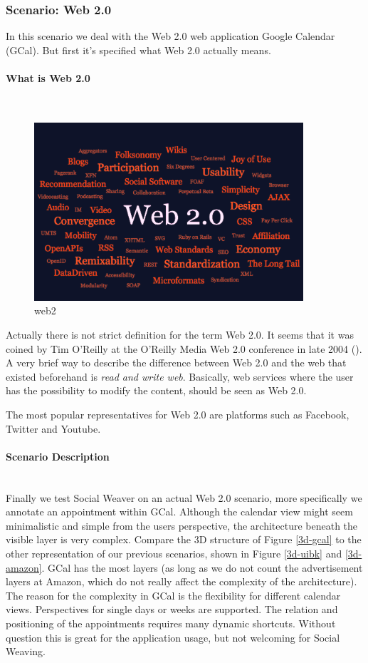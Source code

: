 \subsubsection{Scenario: Web 2.0}
In this scenario we deal with the Web 2.0 web application Google Calendar (GCal). But first it's specified what Web 2.0 actually means.

\paragraph{What is Web 2.0}\mbox{}\\
\begin{figure}\centering
		\includegraphics[width=10cm]{images/web2.png}
		\caption{web2}
		\label{Web 2.0 tag cloud - a common Web 2.0 feature itself.}
\end{figure} 

Actually there is not strict definition for the term Web 2.0. It seems that it was coined by Tim O'Reilly at the O'Reilly Media Web 2.0 conference in late 2004 (\cite{o2005web}). A very brief way to describe the difference between Web 2.0 and the web that existed beforehand is \emph{read and write web}. Basically, web services where the user has the possibility to modify the content, should be seen as Web 2.0. 

The most popular representatives for Web 2.0 are platforms such as Facebook, Twitter and Youtube.

\paragraph{Scenario Description}\mbox{}\\
Finally we test Social Weaver on an actual Web 2.0 scenario, more specifically we annotate an appointment within GCal. Although the calendar view might seem minimalistic and simple from the users perspective, the architecture beneath the visible layer is very complex. Compare the 3D structure of Figure \ref{3d-gcal} to the other representation of our previous scenarios, shown in Figure \ref{3d-uibk} and \ref{3d-amazon}. GCal has the most layers (as long as we do not count the advertisement layers at Amazon, which do not really affect the complexity of the architecture). The reason for the complexity in GCal is the flexibility for different calendar views. Perspectives for single days or  weeks are supported. The relation and positioning of the appointments requires many dynamic shortcuts. Without question this is great for the application usage, but not welcoming for Social Weaving. 

